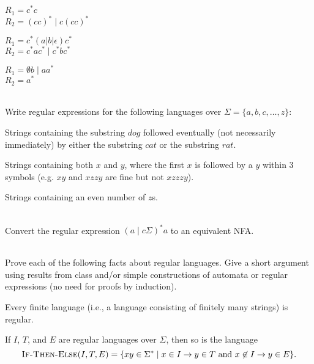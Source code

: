 \documentclass[11pt]{article}
\begin{document}
\begin{qunlist}
\begin{qparts}
\item
$R_1 = c^* c$ \\
$R_2 = (cc)^* \; | \; c(cc)^*$

\item
$R_1 = c^* (a | b | \epsilon) c^*$ \\
$R_2 = c^* a c^* \; | \; c^* b c^*$

\item
$R_1 = \emptyset b \; | \; a a^*$ \\
$R_2 = a^*$
\end{qparts}

\newpage

\\
Write regular expressions for the following languages over $\Sigma = \{a,b,c,\dots,z\}$:

\begin{qparts}
\item
Strings containing the substring $dog$ followed eventually (not necessarily immediately) by either the substring $cat$ or the substring $rat$.

\item
Strings containing both $x$ and $y$, where the first $x$ is followed by a $y$ within 3 symbols (e.g. $xy$ and $xzzy$ are fine but not $xzzzy$).

\item
Strings containing an even number of $z$s.
\end{qparts}

\newpage

\\
Convert the regular expression $(a \;|\; c\Sigma)^* a$ to an equivalent NFA.

\newpage

\\
Prove each of the following facts about regular languages.
Give a short argument using results from class and/or simple constructions of automata or regular expressions (no need for proofs by induction).

\begin{qparts}
\item
Every finite language (i.e., a language consisting of finitely many strings) is regular.

\item
If $I$, $T$, and $E$ are regular languages over $\Sigma$, then so is the language
\[
\textsc{If-Then-Else}(I, T, E) = \{ x y \in \Sigma^* \;|\; x \in I \rightarrow y \in T \text { and } x \not \in I \rightarrow y \in E \} .
\]


\end{qparts}
\end{qunlist}
\end{document}
